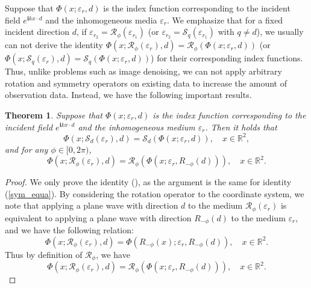 \documentclass{article}
\newtheorem{theorem}{Theorem}
\begin{document}
Suppose that $\Phi(x;\varepsilon_{r},d)$ is the index function corresponding to the incident field $e^{\mathbf{i}kx\cdot d}$ and the inhomogeneous media $\varepsilon_{r}$. We emphasize that for a fixed incident direction $d$, if $\varepsilon_{r_2}=\mathcal{R}_{\phi}(\varepsilon_{r_1})$ (or $\varepsilon_{r_2}=\mathcal{S}_{q}(\varepsilon_{r_1})$ with $q\ne d$), we usually can not derive the identity $\Phi(x;\mathcal{R}_{\phi}(\varepsilon_{r}),d)=\mathcal{R}_{\phi}(\Phi(x;\varepsilon_{r},d))$ (or $\Phi(x;\mathcal{S}_{q}(\varepsilon_{r}),d)=\mathcal{S}_{q}(\Phi(x;\varepsilon_{r},d))$) for their corresponding index functions. Thus, unlike problems such as image denoising, we can not apply arbitrary rotation and symmetry operators on existing data to increase the amount of observation data. Instead, we have the following important results. 
\begin{theorem}
	Suppose that $\Phi(x;\varepsilon_{r},d)$ is the index function corresponding to the incident field $e^{\mathbf{i}kx\cdot d}$ and the inhomogeneous medium $\varepsilon_{r}$. Then it holds that
	\begin{equation}
		\Phi(x;\mathcal{S}_{d}(\varepsilon_{r}),d)=\mathcal{S}_{d}(\Phi(x;\varepsilon_{r},d)),\quad x\in \mathbb{R}^2,
		\label{sym_equa}
	\end{equation}
	and for any $\phi\in [0,2\pi)$,
	\begin{equation}
		\Phi(x;\mathcal{R}_{\phi}(\varepsilon_{r}),d)= \mathcal{R}_{\phi}(\Phi(x;\varepsilon_{r},R_{-\phi}(d))),
		\quad x\in \mathbb{R}^2.
		\label{roata_qua}
	\end{equation}
	\label{thm_Rota}
\end{theorem}
\begin{proof}
	We only prove the identity (), as the argument is the same for identity (\ref{sym_equa}). 
	By considering the rotation operator to the coordinate system, we note that applying a plane wave with direction $d$ to the medium $\mathcal{R}_{\phi}(\varepsilon_{r})$ is equivalent to applying a plane wave with direction $R_{-\phi}(d)$ to the medium $\varepsilon_{r}$, and we have the following relation:
	\begin{equation}
		\Phi(x;\mathcal{R}_{\phi}(\varepsilon_{r}),d)= \Phi(R_{-\phi}(x);\varepsilon_{r},R_{-\phi}(d)),
		\quad x\in \mathbb{R}^2.
	\end{equation}
Thus by definition of $\mathcal{R}_{\phi}$, we have
\begin{equation}
	\Phi(x;\mathcal{R}_{\phi}(\varepsilon_{r}),d)= \mathcal{R}_{\phi}(\Phi(x;\varepsilon_{r},R_{-\phi}(d))),
	\quad x\in \mathbb{R}^2.
\end{equation}

\end{proof}
\end{document}
